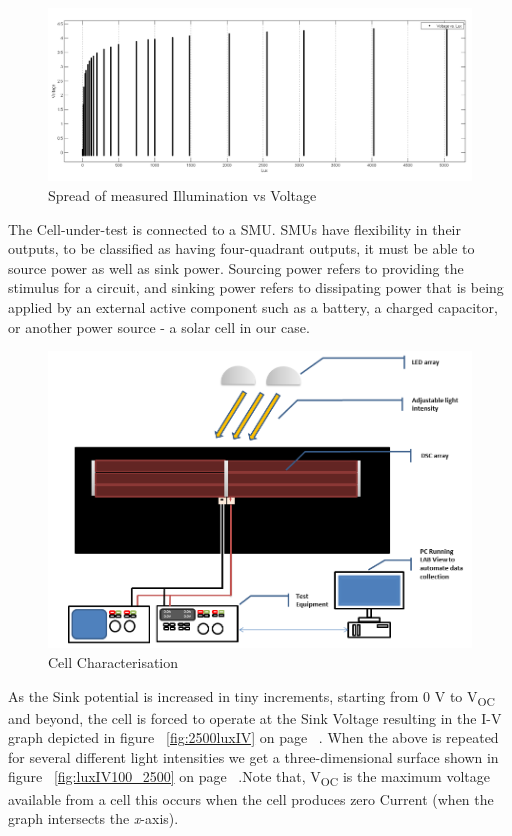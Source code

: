  \begin{figure}[H]
  \begin{center}
	\includegraphics[width=0.9\linewidth]{images/Voltagevlux}
	\caption{Spread of measured Illumination vs Voltage  }
	\label{fig:Voltagevlux}
  \end{center}
 \end{figure}
 The Cell-under-test is connected to a \ac{SMU}. \ac{SMU}s have flexibility in their outputs, to be classified as having four-quadrant outputs, it must be able to source power as well as sink power. Sourcing power refers to providing the stimulus for a circuit, and sinking power refers to dissipating power that is being applied by an external active component such as a battery, a charged capacitor, or another power source \cite{NI_SMU} - a solar cell in our case.
 \begin{figure}[H]
	  \begin{center}
		  \includegraphics[width=\textwidth]{images/Cell_under_test}
		  \caption{Cell Characterisation }
		  \label{fig:Cell_U_test}
	  \end{center}
 \end{figure}
 As the Sink potential is increased in tiny increments, starting from  0 V to V\textsubscript{OC} and beyond, the cell is forced to operate at the Sink Voltage resulting in the I-V graph depicted in figure ~\ref{fig:2500luxIV} on page ~\pageref{fig:2500luxIV}. When the above is repeated for several different light intensities we get a three-dimensional surface shown in figure ~\ref{fig:luxIV100_2500} on page ~\pageref{fig:luxIV100_2500}.Note that, V\textsubscript{OC} is the maximum voltage available from a cell this occurs when the cell produces zero Current (when the graph intersects the \textit{x}-axis).\\
 
